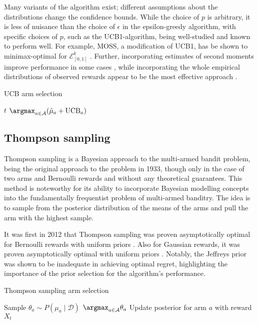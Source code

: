 Many variants of the algorithm exist; different assumptions about the distributions change the confidence bounds.
While the choice of $p$ is arbitrary, it is less of nuisance than the choice of $\epsilon$ in the epsilon-greedy algorithm, with specific choices of $p$, such as the UCB1-algorithm, being well-studied and known to perform well.
For example, MOSS, a modification of UCB1, has be shown to minimax-optimal for $\mathcal{E}_{[0,1]}^k$ \autocite{audibert2009}.
Further, incorporating estimates of second moments improve performance in some cases \autocite{audibert2009a}, while incorporating the whole empirical distributions of observed rewards appear to be the most effective approach \autocite{maillard2011}.

\begin{algorithm}
    \caption{UCB arm selection}
    \label{alg:ucb}
    \begin{algorithmic}
        \State \Return $t$
        \Else
        \State \Return $\argmax_{a \in \mathcal{A}} (\hat{\mu}_a + \text{UCB}_a)$
        \EndIf
    \end{algorithmic}
\end{algorithm}


\subsection{Thompson sampling}
Thompson sampling is a Bayesian approach to the multi-armed bandit problem, being the original approach to the problem \autocite{thompson1933} in 1933, though only in the case of two arms and Bernoulli rewards and without any theoretical guarantees.
This method is noteworthy for its ability to incorporate Bayesian modelling concepts into the fundamentally frequentist problem of multi-armed banditry.
The idea is to sample from the posterior distribution of the means of the arms and pull the arm with the highest sample.

It was first in 2012 that Thompson sampling was proven asymptotically optimal for Bernoulli rewards with uniform priors \autocite{kaufmann2012}.
Also for Gaussian rewards, it was proven asymptotically optimal with uniform priors \autocite{honda2014}.
Notably, the Jeffreys prior was shown to be inadequate in achieving optimal regret, highlighting the importance of the prior selection for the algorithm's performance.

\begin{algorithm}
    \caption{Thompson sampling arm selection}
    \label{alg:thompson}
    \begin{algorithmic}
        \State Sample $\theta_a \sim P(\mu_a \mid \mathcal{D})$
        \EndFor
        \State \Return $\argmax_{a \in \mathcal{A}} \theta_a$
        \State Update posterior for arm $a$ with reward $X_t$
    \end{algorithmic}
\end{algorithm}

